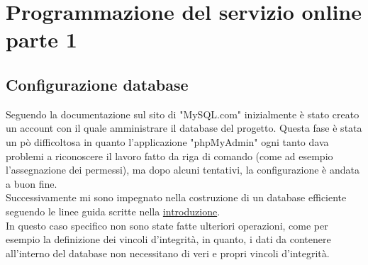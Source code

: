 \chapter{Programmazione del servizio online parte 1}\label{cap:Programmazione del servizio online parte1}

\section{Configurazione database}\label{sez:Configurazione database}

Seguendo la documentazione sul sito di "MySQL.com" inizialmente è stato creato un account con il quale amministrare il database del progetto. Questa fase è stata un pò difficoltosa in quanto l'applicazione "phpMyAdmin" ogni tanto dava  problemi a riconoscere il lavoro fatto da riga di comando (come ad esempio l'assegnazione dei permessi), ma dopo alcuni tentativi, la configurazione è andata a buon fine.\\
Successivamente mi sono impegnato nella costruzione di un database efficiente seguendo le linee guida scritte nella \hyperref[cap:Introduzione]{introduzione}.\\
In questo caso specifico non sono state fatte ulteriori operazioni, come per esempio la definizione dei vincoli d'integrità, in quanto, i dati da contenere all'interno del database non necessitano di veri e propri vincoli d'integrità.\\

